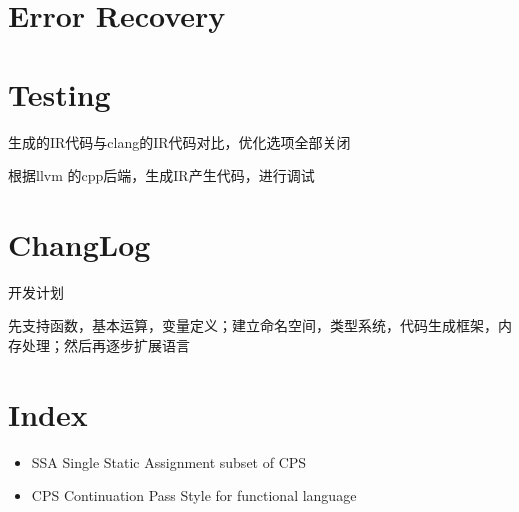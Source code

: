 \documentclass[11pt]{article} %
\begin{document}
\section{Error Recovery}

\section{Testing}
生成的IR代码与clang的IR代码对比，优化选项全部关闭


根据llvm 的cpp后端，生成IR产生代码，进行调试
\section{ChangLog}
开发计划 

先支持函数，基本运算，变量定义；建立命名空间，类型系统，代码生成框架，内存处理；然后再逐步扩展语言

\section{Index}
\begin{itemize}
\item SSA Single Static Assignment subset of CPS
\item CPS Continuation Pass Style for functional language
\end{itemize}
\end{document}
